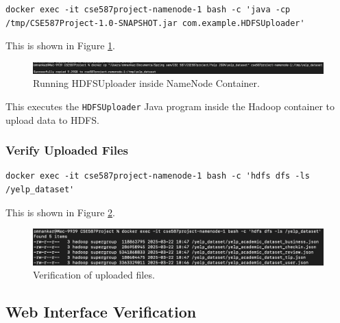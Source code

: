 \documentclass[conference]{IEEEtran}
\begin{document}
\begin{verbatim}
docker exec -it cse587project-namenode-1 bash -c 'java -cp /tmp/CSE587Project-1.0-SNAPSHOT.jar com.example.HDFSUploader'
\end{verbatim}
This is shown in Figure \ref{fig:successfully_copied_9_29}.
\begin{figure}[htbp]
    \centerline{\includegraphics[width=1\textwidth]{graphics/successfully_copied_9_29.png}}
    \caption{Running HDFSUploader inside NameNode Container.}
    \label{fig:successfully_copied_9_29}
\end{figure}
This executes the \texttt{HDFSUploader} Java program inside the Hadoop container
to upload data to HDFS.

\subsubsection{Verify Uploaded Files}

\begin{verbatim}
docker exec -it cse587project-namenode-1 bash -c 'hdfs dfs -ls /yelp_dataset'
\end{verbatim}
This is shown in Figure \ref{fig:verify_uploaded_files}.
\begin{figure}[htbp]
    \centerline{\includegraphics[width=1\textwidth]{graphics/verify_uploaded_files.png}}
    \caption{Verification of uploaded files.}
    \label{fig:verify_uploaded_files}
\end{figure}

\subsection{Web Interface Verification}
\end{document}
